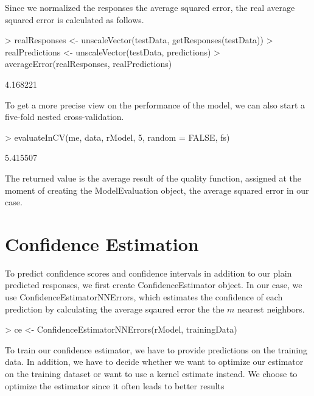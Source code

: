 \documentclass{article}
\begin{document}
Since we normalized the responses the average squared error,
the real average squared error is calculated as follows.

\begin{Schunk}
\begin{Sinput}
> realResponses <- unscaleVector(testData, getResponses(testData))
> realPredictions <- unscaleVector(testData, predictions)
> averageError(realResponses, realPredictions)
\end{Sinput}
\begin{Soutput}
[1] 4.168221
\end{Soutput}
\end{Schunk}

To get a more precise view on the performance of the model,
we can also start a five-fold nested cross-validation.

\begin{Schunk}
\begin{Sinput}
> evaluateInCV(me, data, rModel, 5, random = FALSE, fs)
\end{Sinput}
\begin{Soutput}
[1] 5.415507
\end{Soutput}
\end{Schunk}

The returned value is the average result of the quality
function, assigned at the moment of creating the ModelEvaluation
object, the average squared error in our case.

\section{Confidence Estimation}

To predict confidence scores and confidence intervals in
addition to our plain predicted responses, we first
create ConfidenceEstimator object. In our case, we use
ConfidenceEstimatorNNErrors, which estimates the
confidence of each prediction by calculating the
average sqaured error the the $m$ nearest neighbors.

\begin{Schunk}
\begin{Sinput}
> ce <- ConfidenceEstimatorNNErrors(rModel, trainingData)
\end{Sinput}
\end{Schunk}

To train our confidence estimator, we have to provide
predictions on the training data. In addition, we have
to decide whether we want to optimize our estimator
on the training dataset or want to use a kernel
estimate instead. We choose to optimize the estimator
since it often leads to better results
\end{document}
